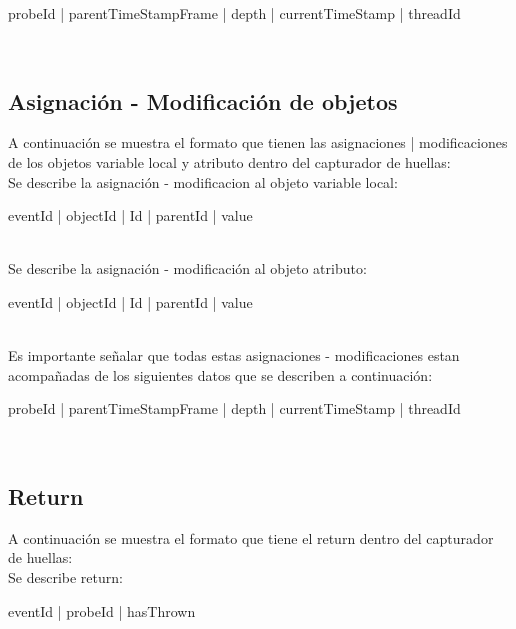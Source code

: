 \documentclass[10pt,a4paper]{article}
\begin{document}
\begin{boxedverbatim}
probeId | parentTimeStampFrame | depth | currentTimeStamp | threadId
\end{boxedverbatim}
\\

\subsection{Asignación - Modificación de objetos}
A continuación se muestra el formato que tienen las asignaciones | modificaciones de los objetos variable local y atributo dentro del capturador de huellas:\\

Se describe la asignación - modificacion al objeto variable local:\\

\begin{boxedverbatim}
eventId | objectId | Id | parentId | value
\end{boxedverbatim}
\\

Se describe la asignación - modificación al objeto atributo:\\

\begin{boxedverbatim}
eventId | objectId | Id | parentId | value
\end{boxedverbatim}
\\

Es importante señalar que todas estas asignaciones - modificaciones estan acompañadas de los siguientes datos que se describen a continuación:\\

\begin{boxedverbatim}
probeId | parentTimeStampFrame | depth | currentTimeStamp | threadId
\end{boxedverbatim}
\\

\subsection{Return}
A continuación se muestra el formato que tiene el return dentro del capturador de huellas:\\

Se describe return:\\

\begin{boxedverbatim}
eventId | probeId | hasThrown
\end{boxedverbatim}
\\
\end{document}
